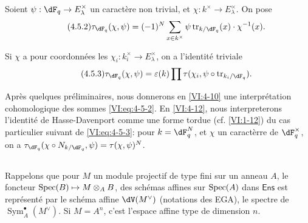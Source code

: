 Soient $\psi:\dF_q\to E_\lambda^\times$ un caract\`ere non trivial, et 
$\chi:k^\times \to E_\lambda^\times$. On pose 
\begin{equation*}\tag{4.5.2}\label{VI:eq:4-5-2}
  \tau_{\dF_q}(\chi,\psi) = (-1)^N \sum_{x\in k^\times} \psi \tr_{k/\dF_q}(x) \cdot \chi^{-1}(x) \text{.} 
\end{equation*}

Si $\chi$ a pour coordonn\'ees les $\chi_i:k_i^\times \to E_\lambda^\times$, on 
a l'identit\'e triviale 
\begin{equation*}\tag{4.5.3}\label{VI:eq:4-5-3}
  \tau_{\dF_q}(\chi,\psi) = \varepsilon(k) \prod \tau(\chi_i,\psi\circ \tr_{k_i/\dF_q}) \text{.}
\end{equation*}

Apr\`es quelques pr\'eliminaires, nous donnerons en \ref{VI:4-10} une 
interpr\'etation cohomologique des sommes \eqref{VI:eq:4-5-2}. En 
\ref{VI:4-12}, nous interpreterons l'identit\'e de Hasse-Davenport comme une 
forme tordue (cf. \ref{VI:1-12}) du cas particulier suivant de 
\eqref{VI:eq:4-5-3}: pour $k=\dF_q^N$, et $\chi$ un caract\`erre de 
$\dF_q^\times$, on a 
$\tau_{\dF_q}(\chi\circ N_{k/\dF_q},\psi)=\tau(\chi,\psi)^N$. 





\subsection{}\label{VI:4-6}

Rappelons que pour $M$ un module projectif de type fini sur un anneau $A$, le 
foncteur $\operatorname{Spec}(B)\mapsto M\otimes_A B$, des sch\'emas affines sur $\operatorname{Spec}(A)$ 
dans $\mathsf{Ens}$ est repr\'esent\'e par le sch\'ema affine $\dV(M^\vee)$ 
(notations des EGA), le spectre de $\operatorname{Sym}_A^\bullet(M^\vee)$. Si 
$M=A^n$, c'est l'espace affine type de dimension $n$. 

